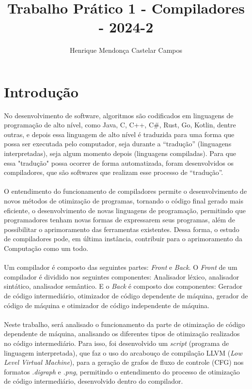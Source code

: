 \documentclass[12pt]{article}
\title{Trabalho Prático 1 - Compiladores - 2024-2}
\author{Henrique Mendonça Castelar Campos}
\begin{document}
\maketitle

\section{Introdução}

\paragraph{}No desenvolvimento de software, algoritmos são codificados em linguagens de programação de alto nível, como Java, C, C++, C\#, Rust, Go, Kotlin, dentre outras, e depois essa linguagem de alto nível é traduzida para uma forma que possa ser executada pelo computador, seja durante a “tradução” (linguagens interpretadas), seja algum momento depois (linguagens compiladas). Para que essa "tradução" possa ocorrer de forma automatizada, foram desenvolvidos os compiladores, que são softwares que realizam esse processo de “tradução”.

\paragraph{}O entendimento do funcionamento de compiladores permite o desenvolvimento de novos métodos de otimização de programas, tornando o código final gerado mais eficiente, o desenvolvimento de novas linguagens de programação, permitindo que programadores tenham novas formas de expressarem seus programas, além de possibilitar o aprimoramento das ferramentas existentes. Dessa forma, o estudo de compiladores pode, em última instância, contribuir para o aprimoramento da Computação como um todo.

\paragraph{}Um compilador é composto das seguintes partes: \textit{Front} e \textit{Back}. O \textit{Front} de um compilador é dividido nos seguintes componentes: Analisador léxico, analisador sintático, analisador semântico. E o \textit{Back} é composto dos componentes: Gerador de código intermediário, otimizador de código dependente de máquina, gerador de código de máquina e otimizador de código independente de máquina.

\paragraph{}Neste trabalho, será analisado o funcionamento da parte de otimização de código dependente de máquina, analisando os diferentes tipos de otimização realizados no código intermediário. Para isso, foi desenvolvido um \textit{script} (programa de linguagem interpretada), que faz o uso do arcabouço de compilação LLVM (\textit{Low Level Virtual Machine}), para a geração de grafos de fluxo de controle (CFG) nos formatos \textit{.digraph} e \textit{.png}, permitindo o entendimento do processo de otimização de código intermediário, desenvolvido dentro do compilador.
\end{document}
